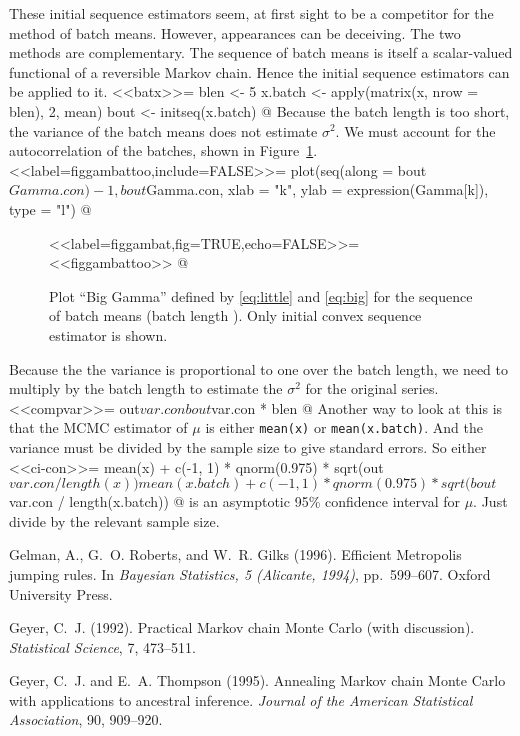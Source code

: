 \documentclass{article}
\begin{document}
	These initial sequence estimators seem, at first sight to be a competitor
	for the method of batch means.  However, appearances can be deceiving.
	The two methods are complementary.  The sequence of batch means is itself
	a scalar-valued functional of a reversible Markov chain.  Hence the
	initial sequence estimators can be applied to it.
	<<batx>>=
	blen <- 5
	x.batch <- apply(matrix(x, nrow = blen), 2, mean)
	bout <- initseq(x.batch)
	@
	Because the batch length is too short, the variance of the batch means
	does not estimate $\sigma^2$.  We must account for the autocorrelation
	of the batches, shown in Figure~\ref{fig:gambat}.
	<<label=figgambattoo,include=FALSE>>=
	plot(seq(along = bout$Gamma.con) - 1, bout$Gamma.con,
	xlab = "k", ylab = expression(Gamma[k]), type = "l")
	@
	\begin{figure}
		\begin{center}
			<<label=figgambat,fig=TRUE,echo=FALSE>>=
			<<figgambattoo>>
			@
		\end{center}
		\caption{Plot ``Big Gamma'' defined by \eqref{eq:little} and \eqref{eq:big}
			for the sequence of batch means (batch length ).
			Only initial convex sequence estimator is shown.}
		\label{fig:gambat}
	\end{figure}
	Because the the variance is proportional to one over the batch length,
	we need to multiply by the batch length to estimate the $\sigma^2$
	for the original series.
	<<compvar>>=
	out$var.con
	bout$var.con * blen
	@
	Another way to look at this is that the MCMC estimator of $\mu$ is
	either \texttt{mean(x)} or \texttt{mean(x.batch)}.  And the variance
	must be divided by the sample size to give standard errors.  So either
	<<ci-con>>=
	mean(x) + c(-1, 1) * qnorm(0.975) * sqrt(out$var.con / length(x))
	mean(x.batch) + c(-1, 1) * qnorm(0.975) * sqrt(bout$var.con / length(x.batch))
	@
	is an asymptotic 95\% confidence interval for $\mu$.  Just divide by
	the relevant sample size.
	
	\begin{thebibliography}{}
		
		Gelman, A., G.~O. Roberts, and W.~R. Gilks (1996).
		\newblock Efficient Metropolis jumping rules.
		\newblock In \emph{Bayesian Statistics, 5 (Alicante, 1994)}, pp.~599--607.
		Oxford University Press.
		
		Geyer, C.~J. (1992).
		\newblock Practical Markov chain Monte Carlo (with discussion).
		\newblock \emph{Statistical Science}, 7, 473--511.
		
		Geyer, C.~J. and E.~A. Thompson (1995).
		\newblock Annealing Markov chain Monte Carlo with applications to
		ancestral inference.
		\newblock \emph{Journal of the American Statistical Association}, 90, 909--920.
		
	\end{thebibliography}
	
\end{document}
